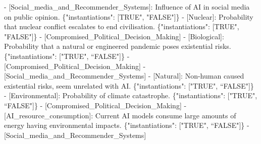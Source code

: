\documentclass[
  11pt,
  letterpaper,
  openany]{book}
\newenvironment{Shaded}{\begin{snugshade}}{\end{snugshade}}
\newcommand{\DataTypeTok}[1]{\textcolor[rgb]{0.68,0.00,0.00}{#1}}
\newcommand{\ErrorTok}[1]{\textcolor[rgb]{0.68,0.00,0.00}{#1}}
\newcommand{\FunctionTok}[1]{\textcolor[rgb]{0.28,0.35,0.67}{#1}}
\newcommand{\OtherTok}[1]{\textcolor[rgb]{0.00,0.23,0.31}{#1}}
\newcommand{\StringTok}[1]{\textcolor[rgb]{0.13,0.47,0.30}{#1}}
\begin{document}
\begin{Shaded}
\begin{Highlighting}[]
    \ErrorTok{{-}} \OtherTok{[}\ErrorTok{Social\_media\_and\_Recommender\_Systems}\OtherTok{]}\ErrorTok{:} \ErrorTok{Influence} \ErrorTok{of} \ErrorTok{AI} \ErrorTok{in} \ErrorTok{social} \ErrorTok{media} \ErrorTok{on} \ErrorTok{public} \ErrorTok{opinion.} \FunctionTok{\{}\DataTypeTok{"instantiations"}\FunctionTok{:} \OtherTok{[}\ErrorTok{TRUE}\StringTok{", "}\ErrorTok{FALSE}\StringTok{"]\}}
\StringTok{{-} [Nuclear]: Probability that nuclear conflict escalates to end civilisation. \{"}\ErrorTok{instantiations}\StringTok{": [TRUE"}\OtherTok{,} \StringTok{"FALSE"}\OtherTok{]}\FunctionTok{\}}
  \ErrorTok{{-}} \OtherTok{[}\ErrorTok{Compromised\_Political\_Decision\_Making}\OtherTok{]}
\ErrorTok{{-}} \OtherTok{[}\ErrorTok{Biological}\OtherTok{]}\ErrorTok{:} \ErrorTok{Probability} \ErrorTok{that} \ErrorTok{a} \ErrorTok{natural} \ErrorTok{or} \ErrorTok{engineered} \ErrorTok{pandemic} \ErrorTok{poses} \ErrorTok{existential} \ErrorTok{risks.} \FunctionTok{\{}\DataTypeTok{"instantiations"}\FunctionTok{:} \OtherTok{[}\StringTok{"TRUE"}\OtherTok{,} \ErrorTok{“FALSE}\StringTok{"]\}}
\StringTok{  {-} [Compromised\_Political\_Decision\_Making]}
\StringTok{  {-} [Social\_media\_and\_Recommender\_Systems]}
\StringTok{{-} [Natural]: Non{-}human caused existential risks, seem unrelated with AI. \{"}\ErrorTok{instantiations}\StringTok{": ["}\ErrorTok{TRUE}\StringTok{", “FALSE"}\OtherTok{]}\FunctionTok{\}}
\ErrorTok{{-}} \OtherTok{[}\ErrorTok{Environmental}\OtherTok{]}\ErrorTok{:} \ErrorTok{Probability} \ErrorTok{of} \ErrorTok{climate} \ErrorTok{catastrophe.} \FunctionTok{\{}\DataTypeTok{"instantiations"}\FunctionTok{:} \OtherTok{[}\StringTok{"TRUE"}\OtherTok{,} \ErrorTok{“FALSE}\StringTok{"]\}}
\StringTok{  {-} [Compromised\_Political\_Decision\_Making]}
\StringTok{  {-} [AI\_resource\_consumption]: Current AI models consume large amounts of energy having environmental impacts. \{"}\ErrorTok{instantiations}\StringTok{": ["}\ErrorTok{TRUE}\StringTok{", “FALSE"}\OtherTok{]}\FunctionTok{\}}
  \ErrorTok{{-}} \OtherTok{[}\ErrorTok{Social\_media\_and\_Recommender\_Systems}\OtherTok{]}
\end{Highlighting}
\end{Shaded}



\backmatter
\printbibliography[title=Bibliography]



\clearpage
\thispagestyle{empty} %

\end{document}
